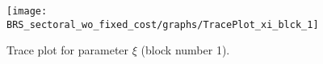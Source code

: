 \begin{figure}[H]
\centering
  \texttt{[image: BRS\_sectoral\_wo\_fixed\_cost/graphs/TracePlot\_xi\_blck\_1]}\\
    \caption{Trace plot for parameter $\xi$ (block number 1).}
\end{figure}
